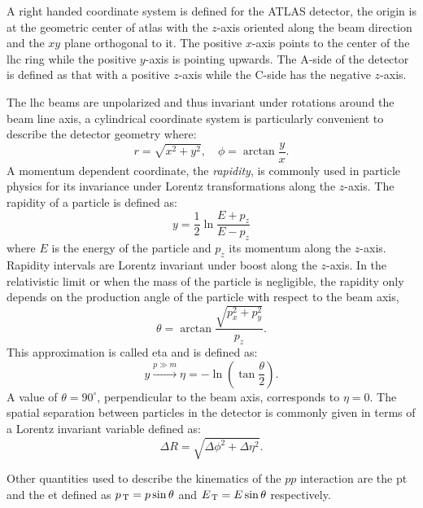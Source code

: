 A right handed coordinate system is defined for the ATLAS detector, the origin
is at the geometric center of \gls{atlas} with the $z$-axis oriented along the
beam direction and the $xy$ plane orthogonal to it. The positive $x$-axis points
to the center of the \gls{lhc} ring while the positive $y$-axis is pointing
upwards. The A-side of the detector is defined as that with a positive $z$-axis
while the C-side has the negative $z$-axis.

The \gls{lhc} beams are unpolarized and thus invariant under rotations around
the beam line axis, a cylindrical coordinate system is particularly convenient
to describe the detector geometry where:
\begin{equation}
  \label{eq:73}
  r = \sqrt{x^2 + y^2}, \quad \phi = \arctan \frac{y}{x}.
\end{equation}
A momentum dependent coordinate, the \emph{rapidity}, is commonly used in
particle physics for its invariance under Lorentz transformations along the
$z$-axis. The rapidity of a particle is defined as:
\begin{equation}
  \label{eq:74}
  y = \frac{1}{2} \ln \frac{E + p_z}{E - p_z}
\end{equation}
where $E$ is the energy of the particle and $p_z$ its momentum along the
$z$-axis. Rapidity intervals are Lorentz invariant under boost along the
$z$-axis. In the relativistic limit or when the mass of the particle is
negligible, the rapidity only depends on the production angle of the particle
with respect to the beam axis,
\begin{equation}
  \label{eq:75}
  \theta = \arctan \frac{\sqrt{p_x^2 + p_y^2}}{p_z}.
\end{equation}
This approximation is called \gls{eta} and is defined as:
\begin{equation}
  \label{eq:76}
  y \xrightarrow{p \gg m} \eta = - \ln \left( \tan \frac{\theta}{2} \right).
\end{equation}
A value of $\theta = 90^{\circ}$, perpendicular to the beam axis, corresponds to
$\eta = 0$. The spatial separation between particles in the detector is commonly
given in terms of a Lorentz invariant variable defined as:
\begin{equation}
  \label{eq:77}
  \Delta R = \sqrt{\Delta \phi^2 + \Delta \eta^2}.
\end{equation}

Other quantities used to describe the kinematics of the $pp$ interaction are the
\gls{pt} and the \gls{et} defined as $p_\mathrm{\, T} = p \sin \theta$ and
$E_\mathrm{\, T} = E \sin \theta$ respectively.
